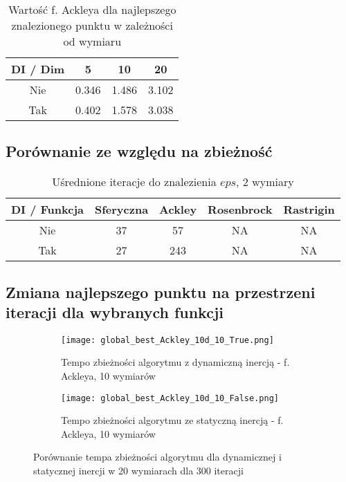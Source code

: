 \documentclass[12pt]{article}
\begin{document}
\begin{table}[h!]
	\centering
	\begin{tabular}{|c|c|c|c|}
		\hline
		DI / Dim & 5     & 10    & 20    \\
		\hline
		Nie      & 0.346 & 1.486 & 3.102 \\
		Tak      & 0.402 & 1.578 & 3.038 \\
		\hline
	\end{tabular}
	\caption{Wartość f. Ackleya dla najlepszego znalezionego punktu w zależności od wymiaru}
	\label{tab:ackley_values}
\end{table}

\pagebreak
\subsection*{Porównanie ze względu na zbieżność}

\begin{table}[h]
	\centering
	\begin{tabular}{|c|c|c|c|c|}
		\hline
		DI / Funkcja & Sferyczna & Ackley & Rosenbrock & Rastrigin \\
		\hline
		Nie          & 37        & 57     & NA         & NA        \\
		Tak          & 27        & 243    & NA         & NA        \\
		\hline
	\end{tabular}
	\caption{Uśrednione iteracje do znalezienia $eps$, 2 wymiary}
	\label{convergence_table}
\end{table}

\FloatBarrier

\subsection*{Zmiana najlepszego punktu na przestrzeni iteracji dla wybranych funkcji}

\begin{figure}[h!]
	\centering
	\begin{subfigure}{0.49\textwidth}
		\texttt{[image: global\_best\_Ackley\_10d\_10\_True.png]}
		\caption{Tempo zbieżności algorytmu z dynamiczną inercją - f. Ackleya, 10 wymiarów}
	\end{subfigure}
	\hfill
	\begin{subfigure}{0.49\textwidth}
		\texttt{[image: global\_best\_Ackley\_10d\_10\_False.png]}
		\caption{Tempo zbieżności algorytmu ze statyczną inercją - f. Ackleya, 10 wymiarów}
	\end{subfigure}
	\caption{Porównanie tempa zbieżności algorytmu dla dynamicznej i statycznej inercji w 20 wymiarach dla 300 iteracji}
	\label{20d_comp}
\end{figure}
\end{document}
